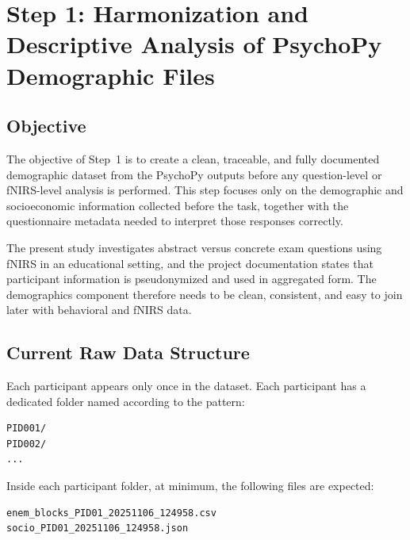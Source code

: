 \documentclass[11pt]{article}
\begin{document}
\sloppy
\section{Step 1: Harmonization and Descriptive Analysis of PsychoPy Demographic Files}
\label{sec:step1_demographics}

\subsection{Objective}
The objective of Step~1 is to create a clean, traceable, and fully documented demographic dataset
from the PsychoPy outputs before any question-level or fNIRS-level analysis is performed.
This step focuses only on the demographic and socioeconomic information collected before the task,
together with the questionnaire metadata needed to interpret those responses correctly.

The present study investigates abstract versus concrete exam questions using fNIRS in an educational
setting, and the project documentation states that participant information is pseudonymized and used
in aggregated form. The demographics component therefore needs to be clean, consistent, and easy
to join later with behavioral and fNIRS data. \cite{step1_project_doc}

\subsection{Current Raw Data Structure}
Each participant appears only once in the dataset.
Each participant has a dedicated folder named according to the pattern:
\begin{verbatim}
PID001/
PID002/
...
\end{verbatim}

Inside each participant folder, at minimum, the following files are expected:
\begin{verbatim}
enem_blocks_PID01_20251106_124958.csv
socio_PID01_20251106_124958.json
\end{verbatim}
\end{document}
